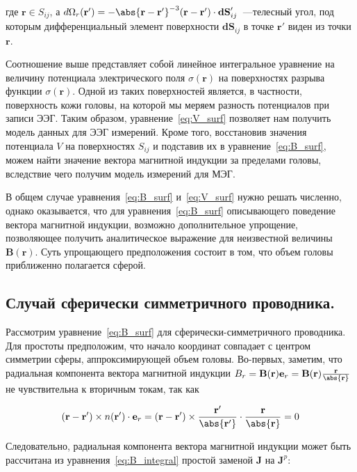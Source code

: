 где $\mathbf{r} \in S_{ij}$, а $d\Omega_r(\mathbf{r}') =
{-\abs{\mathbf{r}-\mathbf{r}'}^{-3}(\mathbf{r}-\mathbf{r}')\cdot \mathbf{dS}'_{ij}}$~---телесный угол,
под которым дифференциальный элемент поверхности $\mathbf{dS}_{ij}$
в точке $\mathbf{r}'$ виден из точки $\mathbf{r}$.

Соотношение выше представляет собой линейное интегральное уравнение
на величину потенциала электрического поля $\sigma(\mathbf{r})$
на поверхностях разрыва функции $\sigma(\mathbf{r})$.
Одной из таких поверхностей является, в частности, поверхность кожи головы,
на которой мы меряем разность потенциалов при записи ЭЭГ.
Таким образом, уравнение~\ref{eq:V_surf} позволяет нам получить модель данных для ЭЭГ измерений.
Кроме того, восстановив значения потенциала $V$ на поверхностях $S_{ij}$
и подставив их в уравнение~\ref{eq:B_surf},
можем найти значение вектора магнитной индукции за пределами головы,
вследствие чего получим модель измерений для МЭГ.

В общем случае уравнения~\ref{eq:B_surf} и~\ref{eq:V_surf} нужно решать численно, однако оказывается,
что для уравнения~\ref{eq:B_surf} описывающего поведение вектора магнитной индукции,
возможно дополнительное упрощение,
позволяющее получить аналитическое выражение для неизвестной величины $\mathbf{B}(\mathbf{r})$.
Суть упрощающего предположения состоит в том, что объем головы приближенно полагается сферой.

\subsection{Случай сферически симметричного проводника.}
Рассмотрим уравнение~\ref{eq:B_surf} для сферически-симметричного проводника.
Для простоты  предположим, что начало координат совпадает с центром симметрии сферы,
аппроксимирующей объем головы.
Во-первых, заметим, что радиальная компонента вектора магнитной индукции
$B_r = \mathbf{B}(\mathbf{r}) \mathbf{e}_r = \mathbf{B}(\mathbf{r})\frac{\mathbf{r}}{\abs{\mathbf{r}}}$
не чувствительна к вторичным токам, так как

\begin{equation}
    (\mathbf{r} - \mathbf{r}') \times n(\mathbf{r}') \cdot \mathbf{e}_r =
    (\mathbf{r}-\mathbf{r}') \times
    \frac{\mathbf{r}'}{\abs{\mathbf{r}'}}\cdot\frac{\mathbf{r}}{\abs{\mathbf{r}}} = 0
\end{equation}

Следовательно, радиальная компонента вектора магнитной индукции может быть рассчитана из
уравнения~\ref{eq:B_integral} простой заменой $\mathbf{J}$ на $\mathbf{J}^p$:

